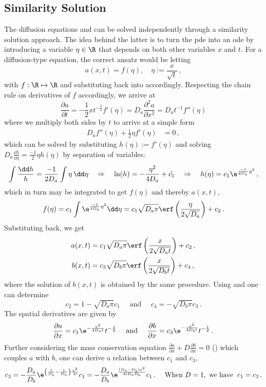 \documentclass{prettytex/ox/mmsc-special-topic}
\begin{document}
  \subsection{Similarity Solution}
  The diffusion equations  and  can be solved independently through a similarity solution approach.
  The idea behind the latter is to turn the \gls{pde} into an \gls{ode} by introducing a variable $\eta \in \R$ that depends on both other variables $x$ and $t$.
  For a diffusion-type equation, the correct ansatz would be letting
  $$a(x, t) = f(\eta), \quad \eta := \frac{x}{\sqrt{t}}\,,$$
  with $f: \R \mapsto \R$ and substituting back into  accordingly.
  Respecting the chain rule on derivatives of $f$ accordingly, we arrive at
  $$\frac{\partial a}{\partial t} = -\frac{1}{2} x t^{-\frac{3}{2}} f'(\eta) = D_a \frac{\partial^2 a}{\partial x^2} = D_a t^{-1} f''(\eta)$$
  where we multiply both sides by $t$ to arrive at a simple form
  \begin{align}
    \label{eq:similarity-solution-ode} D_a f''(\eta) + \frac{1}{2} \eta f'(\eta) & = 0\,,
  \end{align}
  which can be solved by substituting $h(\eta) := f'(\eta)$ and solving $D_a \frac{\dd h}{\dd \eta} = \frac{-1}{2} \eta h(\eta)$ by separation of variables:
  $$\int\frac{\dd h}{h} = \frac{-1}{2D_a} \int \eta \,\dd\eta \quad \Rightarrow \quad \ln(h) = -\frac{\eta^2}{4D_a} + \tilde{c_1} \quad\Rightarrow\quad h(\eta) = c_1 \e^{\frac{-1}{4D_a}\eta^2}\,,$$
  which in turn may be integrated to get $f(\eta)$ and thereby $a(x, t)$,
  $$f(\eta) = c_1 \int \e^{\frac{-1}{4D_a}\eta^2} \dd\eta = c_1 \sqrt{D_a \pi} \erf\left(\frac{\eta}{2 \sqrt{D_a}}\right) + c_2\,.$$
  Substituting back, we get
  \begin{align}
    a(x, t) & = c_1 \sqrt{D_a \pi} \erf\left(\frac{x}{2 \sqrt{D_a t}}\right) + c_2\,, \\
    b(x, t) & = c_3 \sqrt{D_b \pi} \erf\left(\frac{x}{2 \sqrt{D_b t}}\right) + c_4\,,
  \end{align}
  where the solution of $b(x, t)$ is obtained by the same procedure.
  Using  and  one can determine $$c_2 = 1 - \sqrt{D_a \pi} c_1\quad \text{ and }\quad c_4 = -\sqrt{D_b \pi} c_3\,.$$
  The spatial derivatives are given by
  $$\frac{\partial a}{\partial x} = c_1 \e^{-\frac{x^2}{4D_at}} t^{-\frac{1}{2}} \quad \text{ and }\quad \frac{\partial b}{\partial x} = c_3 \e^{-\frac{x^2}{4D_bt}} t^{-\frac{1}{2}}\,.$$
  Further considering the mass conservation equation $\frac{\partial a}{\partial x} + D \frac{\partial b}{\partial x} = 0$ () which couples $a$ with $b$, one can derive a relation between $c_1$ and $c_3$,
  $$c_3 = -\frac{D_a}{D_b} \e^{\left(\frac{1}{D_b} - \frac{1}{D_a}\right) \frac{x^2}{4t}} c_1 = -\frac{D_a}{D_b} \e^{\frac{(D_a-D_b) x^2}{4t D_a D_b}} c_1\,. \quad \text{ When } D=1, \text{ we have } \; c_1 = c_3\,.$$
\end{document}
